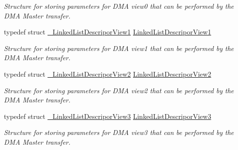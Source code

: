 \begin{DoxyCompactItemize}
\begin{DoxyCompactList}\small\item\em Structure for storing parameters for D\+MA view0 that can be performed by the D\+MA Master transfer. \end{DoxyCompactList}\item 
\mbox{\label{group__dmad__structs_gad7875bda32a17423528ef3eea98e2be3}} 
typedef struct \mbox{\hyperlink{struct__LinkedListDescriporView1}{\+\_\+\+Linked\+List\+Descripor\+View1}} \mbox{\hyperlink{group__dmad__structs_gad7875bda32a17423528ef3eea98e2be3}{Linked\+List\+Descripor\+View1}}
\begin{DoxyCompactList}\small\item\em Structure for storing parameters for D\+MA view1 that can be performed by the D\+MA Master transfer. \end{DoxyCompactList}\item 
\mbox{\label{group__dmad__structs_gaac59b21b8030e0c5fdb50cb2eb3e9313}} 
typedef struct \mbox{\hyperlink{struct__LinkedListDescriporView2}{\+\_\+\+Linked\+List\+Descripor\+View2}} \mbox{\hyperlink{group__dmad__structs_gaac59b21b8030e0c5fdb50cb2eb3e9313}{Linked\+List\+Descripor\+View2}}
\begin{DoxyCompactList}\small\item\em Structure for storing parameters for D\+MA view2 that can be performed by the D\+MA Master transfer. \end{DoxyCompactList}\item 
\mbox{\label{group__dmad__structs_gac23cb46bd7c9eb3aeaaea25c2c535d34}} 
typedef struct \mbox{\hyperlink{struct__LinkedListDescriporView3}{\+\_\+\+Linked\+List\+Descripor\+View3}} \mbox{\hyperlink{group__dmad__structs_gac23cb46bd7c9eb3aeaaea25c2c535d34}{Linked\+List\+Descripor\+View3}}
\begin{DoxyCompactList}\small\item\em Structure for storing parameters for D\+MA view3 that can be performed by the D\+MA Master transfer. \end{DoxyCompactList}\end{DoxyCompactItemize}
